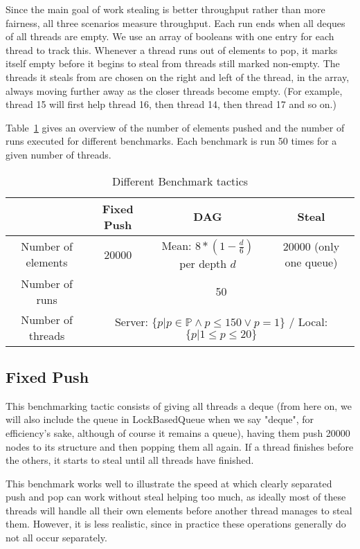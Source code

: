 \documentclass [10pt]{scrartcl}
\begin{document}
   Since the main goal of work stealing is better throughput rather than more fairness, all three scenarios measure throughput.
   Each run ends when all deques of all threads are empty.
   We use an array of booleans with one entry for each thread to track this.
   Whenever a thread runs out of elements to pop, it marks itself empty before it begins to steal from threads still marked non-empty. The threads it steals from are chosen on the right and left of the thread, in the array, always moving further away as the closer threads become empty. (For example, thread 15 will first help thread 16, then thread 14, then thread 17 and so on.)
   
   Table~\ref{tab:benchmark} gives an overview of the number of elements pushed and the number of runs executed for different benchmarks. Each benchmark is run 50 times for a given number of threads.
   
   \begin{table}[h]
      \centering
      \begin{tabular}{c||c|c|c}
         \hline
         & Fixed Push & DAG & Steal \\ \hline
         Number of elements & 20000 & Mean: $8*(1-\frac{d}{6})$ per depth $d$ & $20 000$ (only one queue)  \\ \hline
         Number of runs & \multicolumn{3}{c}{50} \\ \hline
         Number of threads & \multicolumn{3}{c}{Server: $\{p | p \in \mathbb{P} \land p \leq 150 \lor p = 1\}$ / Local: $\{p | 1 \leq p \leq 20 \}$} \\ \hline
      \end{tabular}
      \caption{Different Benchmark tactics}
      \label{tab:benchmark}
   \end{table}
   
   
   \subsection{Fixed Push}
   This benchmarking tactic consists of giving all threads a deque (from here on, we will also include the queue in LockBasedQueue when we say "deque", for efficiency's sake, although of course it remains a queue), having them push 20000 nodes to its structure and then popping them all again. If a thread finishes before the others, it starts to steal until all threads have finished.
   
   This benchmark works well to illustrate the speed at which clearly separated push and pop can work without steal helping too much, as ideally most of these threads will handle all their own elements before another thread manages to steal them. However, it is less realistic, since in practice these operations generally do not all occur separately.
   
\end{document}
